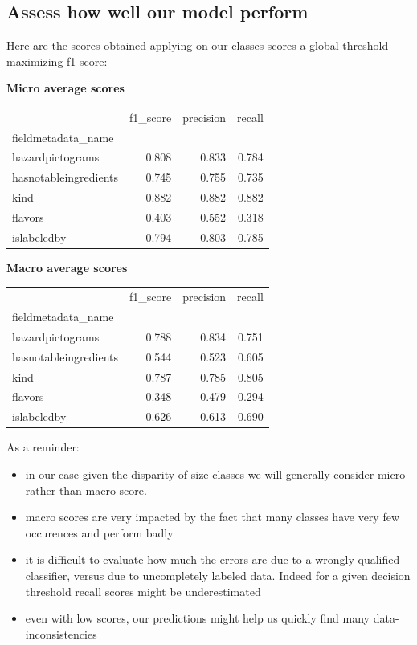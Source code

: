 \subsection{Assess how well our model perform}

Here are the scores obtained applying on our classes scores a global threshold maximizing f1-score:

\textbf{Micro average scores}
\begin{tabular}{lrrr}
\toprule
{} &  f1\_score &  precision &   recall \\
fieldmetadata\_name    &           &            &          \\
\midrule
hazardpictograms      &   0.808 &    0.833 &  0.784 \\
hasnotableingredients &   0.745 &    0.755 &  0.735 \\
kind                  &   0.882 &    0.882 &  0.882 \\
flavors               &   0.403 &    0.552 &  0.318 \\
islabeledby           &   0.794 &    0.803 &  0.785 \\
\bottomrule
\end{tabular}

\textbf{Macro average scores}
\begin{tabular}{lrrr}
\toprule
{} &  f1\_score &  precision &   recall \\
fieldmetadata\_name    &           &            &          \\
\midrule
hazardpictograms      &   0.788 &    0.834 &  0.751 \\
hasnotableingredients &   0.544 &    0.523 &  0.605 \\
kind                  &   0.787 &    0.785 &  0.805 \\
flavors               &   0.348 &    0.479 &  0.294 \\
islabeledby           &   0.626 &    0.613 &  0.690 \\
\bottomrule
\end{tabular}

As a reminder:
\begin{itemize}
 	\item in our case given the disparity of size classes we will generally consider micro rather than macro score.
 	\item macro scores are very impacted by the fact that many classes have very few occurences and perform badly
 	\item it is difficult to evaluate how much the errors are due to a wrongly qualified classifier, versus due to uncompletely labeled data. Indeed for a given decision threshold recall scores might be underestimated
 	\item even with low scores, our predictions might help us quickly find many data-inconsistencies 
\end{itemize}


